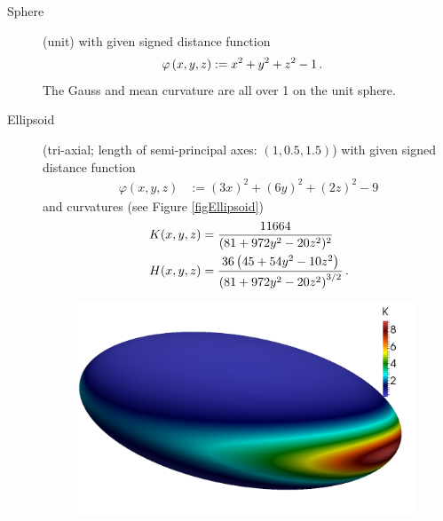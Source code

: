    \begin{description}
      \item[Sphere] (unit) with given signed distance function  
        \begin{align}
             \label{eqSphere}
             \varphi\left( x,y,z \right) &:= x^{2} + y^{2} + z^{2} - 1 \,\text{.}
        \end{align}
        The Gauss and mean curvature are all over 1 on the unit sphere.
        \item[Ellipsoid] (tri-axial; length of semi-principal axes: \( \left( 1,0.5,1.5 \right) \)) 
            with given signed distance function  
              \begin{align}
                \label{eqEllipsoid}
                \varphi\left( x,y,z \right) &:= \left( 3x \right)^{2} + \left( 6y \right)^{2} + \left( 2z \right)^{2} - 9
              \end{align}
            and curvatures (see Figure \ref{figEllipsoid})
            \begin{align}
              K(x,y,z) &= \frac{11664}{(81+972y^{2}-20z^{2})^{2}} \\
              H(x,y,z) &= \frac{36 \left(45+54 y^2-10 z^2\right)}{\left(81+972 y^2-20 z^2\right)^{3/2}} \,\text{.}
            \end{align}
  \begin{figure}
    \begin{minipage}[htp]{.23\textwidth}
      \centering
      \includegraphics[width=0.99\textwidth]{bilder/ellipsoid/K.jpg}
    \end{minipage}\hfill
    \begin{minipage}[htp]{.23\textwidth}
      \centering

\end{minipage}
\end{figure}
\end{description}
